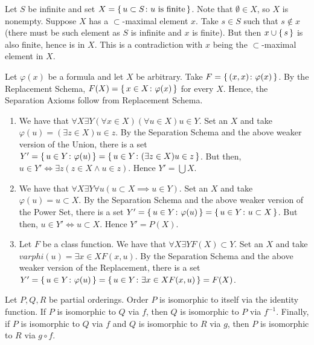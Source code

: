 \documentclass[12pt]{article}
\theoremstyle{definition}
\newenvironment{customthm}[1]
  {\renewcommand\theinnercustomthm{#1}\innercustomthm}
  {\endinnercustomthm}
\begin{document}
\begin{customthm}{I.1.13}
    Let $S$ be infinite and set $X = \{\,{u \subset S \colon u \text{ is finite}}\,\}$. Note that $\emptyset \in X$, so $X$ is nonempty. Suppose $X$ has a $\subset$-maximal element $x$. Take $s \in S$ such that $s \not\in x$ (there must be such element as $S$ is infinite and $x$ is finite). But then $x \cup \{\,{s}\,\}$ is also finite, hence is in $X$. This is a contradiction with $x$ being the $\subset$-maximal element in $X$.
\end{customthm}

\begin{customthm}{I.1.14}
    Let $\varphi(x)$ be a formula and let $X$ be arbitrary. Take $F = \{\,{(x,x) \colon \varphi(x)}\,\}$. By the Replacement Schema, $F(X) = \{\,{x \in X \colon \varphi(x)}\,\}$ for every $X$. Hence, the Separation Axioms follow from Replacement Schema.
\end{customthm}

\begin{customthm}{I.1.15}
\leavevmode
    \begin{enumerate}
        \item We have that $\forall X \exists Y (\forall x \in X) (\forall u \in X) u \in Y$. Set an $X$ and take $\varphi(u) = (\exists z \in X) u \in z$. By the Separation Schema and the above weaker version of the Union, there is a set $Y' = \{\,{u \in Y \colon \varphi(u)}\,\} = \{\,{u \in Y \colon (\exists z \in X) u \in z}\,\}$. But then, $u \in Y' \iff \exists z (z \in X \land u \in z)$. Hence $Y' = \bigcup X$.
        \item We have that $\forall X \exists Y \forall u (u \subset X \implies u \in Y)$. Set an $X$ and take $\varphi(u) = u \subset X$. By the Separation Schema and the above weaker version of the Power Set, there is a set $Y' = \{\,{u \in Y \colon \varphi(u)}\,\} = \{\,{u \in Y \colon u \subset X}\,\}$. But then, $u \in Y' \iff u \subset X$. Hence $Y' = P(X)$.
        \item Let $F$ be a class function. We have that $\forall X \exists Y F(X) \subset Y$. Set an $X$ and take $varphi(u) = \exists x \in X F(x,u)$. By the Separation Schema and the above weaker version of the Replacement, there is a set $Y' = \{\,{u \in Y \colon \varphi(u)}\,\} = \{\,{u \in Y \colon \exists x \in X F(x,u)}\,\} = F(X)$.
    \end{enumerate}
\end{customthm}

\begin{customthm}{I.2.1}
    Let $P,Q,R$ be partial orderings. Order $P$ is isomorphic to itself via the identity function. If $P$ is isomorphic to $Q$ via $f$, then $Q$ is isomorphic to $P$ via $f^{-1}$. Finally, if $P$ is isomorphic to $Q$ via $f$ and $Q$ is isomorphic to $R$ via $g$, then $P$ is isomorphic to $R$ via $g \circ f$.
\end{customthm}
\end{document}
